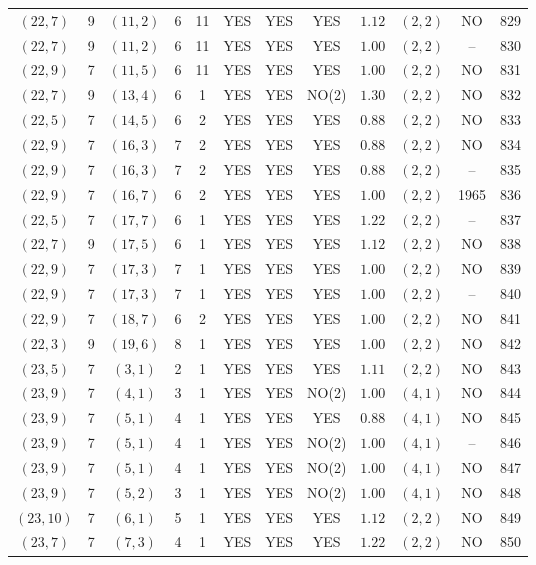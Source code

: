 \begin{longtable}{|c|c|c|c|c|c|c|c|c|c|c|c|}
$(22,7)$ & 9 & $(11,2)$ & 6 & 11 & YES & YES & YES & $1.12$ & $(2,2)$ & NO & 829\\
$(22,7)$ & 9 & $(11,2)$ & 6 & 11 & YES & YES & YES & $1.00$ & $(2,2)$ & -- & 830\\
$(22,9)$ & 7 & $(11,5)$ & 6 & 11 & YES & YES & YES & $1.00$ & $(2,2)$ & NO & 831\\
$(22,7)$ & 9 & $(13,4)$ & 6 & 1 & YES & YES & NO(2) & $1.30$ & $(2,2)$ & NO & 832\\
$(22,5)$ & 7 & $(14,5)$ & 6 & 2 & YES & YES & YES & $0.88$ & $(2,2)$ & NO & 833\\
$(22,9)$ & 7 & $(16,3)$ & 7 & 2 & YES & YES & YES & $0.88$ & $(2,2)$ & NO & 834\\
$(22,9)$ & 7 & $(16,3)$ & 7 & 2 & YES & YES & YES & $0.88$ & $(2,2)$ & -- & 835\\
$(22,9)$ & 7 & $(16,7)$ & 6 & 2 & YES & YES & YES & $1.00$ & $(2,2)$ & 1965 & 836\\
$(22,5)$ & 7 & $(17,7)$ & 6 & 1 & YES & YES & YES & $1.22$ & $(2,2)$ & -- & 837\\
$(22,7)$ & 9 & $(17,5)$ & 6 & 1 & YES & YES & YES & $1.12$ & $(2,2)$ & NO & 838\\
$(22,9)$ & 7 & $(17,3)$ & 7 & 1 & YES & YES & YES & $1.00$ & $(2,2)$ & NO & 839\\
$(22,9)$ & 7 & $(17,3)$ & 7 & 1 & YES & YES & YES & $1.00$ & $(2,2)$ & -- & 840\\
$(22,9)$ & 7 & $(18,7)$ & 6 & 2 & YES & YES & YES & $1.00$ & $(2,2)$ & NO & 841\\
$(22,3)$ & 9 & $(19,6)$ & 8 & 1 & YES & YES & YES & $1.00$ & $(2,2)$ & NO & 842\\
$(23,5)$ & 7 & $(3,1)$ & 2 & 1 & YES & YES & YES & $1.11$ & $(2,2)$ & NO & 843\\
$(23,9)$ & 7 & $(4,1)$ & 3 & 1 & YES & YES & NO(2) & $1.00$ & $(4,1)$ & NO & 844\\
$(23,9)$ & 7 & $(5,1)$ & 4 & 1 & YES & YES & YES & $0.88$ & $(4,1)$ & NO & 845\\
$(23,9)$ & 7 & $(5,1)$ & 4 & 1 & YES & YES & NO(2) & $1.00$ & $(4,1)$ & -- & 846\\
$(23,9)$ & 7 & $(5,1)$ & 4 & 1 & YES & YES & NO(2) & $1.00$ & $(4,1)$ & NO & 847\\
$(23,9)$ & 7 & $(5,2)$ & 3 & 1 & YES & YES & NO(2) & $1.00$ & $(4,1)$ & NO & 848\\
$(23,10)$ & 7 & $(6,1)$ & 5 & 1 & YES & YES & YES & $1.12$ & $(2,2)$ & NO & 849\\
$(23,7)$ & 7 & $(7,3)$ & 4 & 1 & YES & YES & YES & $1.22$ & $(2,2)$ & NO & 850\\

\end{longtable}
